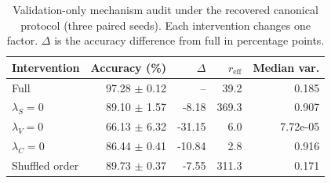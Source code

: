 \begin{table}[H]
\centering
\small
\caption{Validation-only mechanism audit under the recovered canonical protocol (three paired seeds). Each intervention changes one factor. $\Delta$ is the accuracy difference from full \TeReL{} in percentage points.}
\label{tab:mechanism-audit-v2}
\begin{tabular}{lrrrr}
\toprule
Intervention & Accuracy (\%) & $\Delta$ & $r_{\mathrm{eff}}$ & Median var. \\
\midrule
Full \TeReL{} & 97.28 $\pm$ 0.12 & -- & 39.2 & 0.185 \\
$\lambda_S=0$ & 89.10 $\pm$ 1.57 & -8.18 & 369.3 & 0.907 \\
$\lambda_V=0$ & 66.13 $\pm$ 6.32 & -31.15 & 6.0 & 7.72e-05 \\
$\lambda_C=0$ & 86.44 $\pm$ 0.41 & -10.84 & 2.8 & 0.916 \\
Shuffled order & 89.73 $\pm$ 0.37 & -7.55 & 311.3 & 0.171 \\
\bottomrule
\end{tabular}
\end{table}

